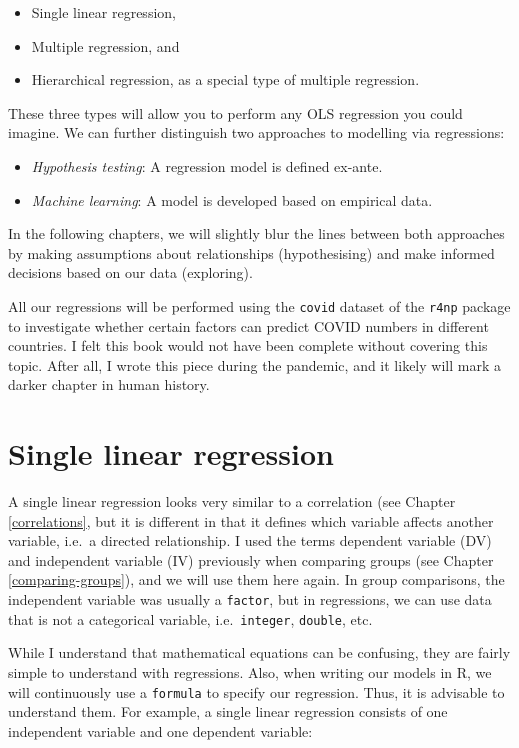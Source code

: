 \documentclass[
]{book}
\begin{document}
\begin{itemize}
\item
  Single linear regression,
\item
  Multiple regression, and
\item
  Hierarchical regression, as a special type of multiple regression.
\end{itemize}

These three types will allow you to perform any OLS regression you could imagine. We can further distinguish two approaches to modelling via regressions:

\begin{itemize}
\item
  \emph{Hypothesis testing}: A regression model is defined ex-ante.
\item
  \emph{Machine learning}: A model is developed based on empirical data.
\end{itemize}

In the following chapters, we will slightly blur the lines between both approaches by making assumptions about relationships (hypothesising) and make informed decisions based on our data (exploring).

All our regressions will be performed using the \texttt{covid} dataset of the \texttt{r4np} package to investigate whether certain factors can predict COVID numbers in different countries. I felt this book would not have been complete without covering this topic. After all, I wrote this piece during the pandemic, and it likely will mark a darker chapter in human history.

\hypertarget{single-linear-regression}{%
\section{Single linear regression}\label{single-linear-regression}}

A single linear regression looks very similar to a correlation (see Chapter \ref{correlations}, but it is different in that it defines which variable affects another variable, i.e.~a directed relationship. I used the terms dependent variable (DV) and independent variable (IV) previously when comparing groups (see Chapter \ref{comparing-groups}), and we will use them here again. In group comparisons, the independent variable was usually a \texttt{factor}, but in regressions, we can use data that is not a categorical variable, i.e.~\texttt{integer}, \texttt{double}, etc.

While I understand that mathematical equations can be confusing, they are fairly simple to understand with regressions. Also, when writing our models in R, we will continuously use a \texttt{formula} to specify our regression. Thus, it is advisable to understand them. For example, a single linear regression consists of one independent variable and one dependent variable:
\end{document}

